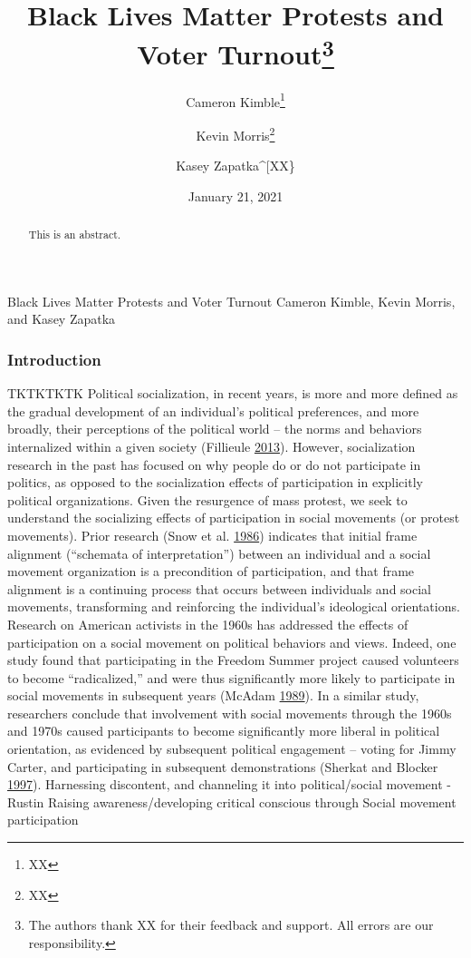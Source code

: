 \documentclass[
  12pt,
]{article}
\title{Black Lives Matter Protests and Voter Turnout\thanks{The authors thank XX for their feedback and support. All errors are our responsibility.}}
\author{Cameron Kimble\footnote{XX} \and Kevin Morris\footnote{XX} \and Kasey Zapatka\^{}{[}XX\}}
\date{January 21, 2021}
\begin{document}
\maketitle
\begin{abstract}
This is an abstract.
\end{abstract}

\pagebreak

\begin{center}
Black Lives Matter Protests and Voter Turnout
Cameron Kimble, Kevin Morris, and Kasey Zapatka
\end{center}

\hypertarget{introduction}{%
\subsubsection*{Introduction}\label{introduction}}

TKTKTKTK
Political socialization, in recent years, is more and more defined as the gradual development of an individual's political preferences, and more broadly, their perceptions of the political world -- the norms and behaviors internalized within a given society (Fillieule \protect\hyperlink{ref-Fillieule2013}{2013}). However, socialization research in the past has focused on why people do or do not participate in politics, as opposed to the socialization effects of participation in explicitly political organizations.
Given the resurgence of mass protest, we seek to understand the socializing effects of participation in social movements (or protest movements). Prior research (Snow et al. \protect\hyperlink{ref-Snow1986}{1986}) indicates that initial frame alignment (``schemata of interpretation'') between an individual and a social movement organization is a precondition of participation, and that frame alignment is a continuing process that occurs between individuals and social movements, transforming and reinforcing the individual's ideological orientations.
Research on American activists in the 1960s has addressed the effects of participation on a social movement on political behaviors and views. Indeed, one study found that participating in the Freedom Summer project caused volunteers to become ``radicalized,'' and were thus significantly more likely to participate in social movements in subsequent years (McAdam \protect\hyperlink{ref-McAdam1989}{1989}). In a similar study, researchers conclude that involvement with social movements through the 1960s and 1970s caused participants to become significantly more liberal in political orientation, as evidenced by subsequent political engagement -- voting for Jimmy Carter, and participating in subsequent demonstrations (Sherkat and Blocker \protect\hyperlink{ref-Sherkat1997}{1997}).
Harnessing discontent, and channeling it into political/social movement
-Rustin
Raising awareness/developing critical conscious through Social movement participation
\end{document}
